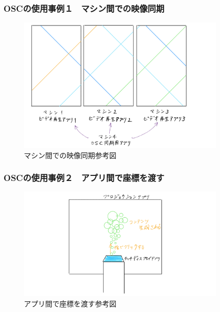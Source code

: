 \documentclass[10pt, dvipdfmx]{beamer}
\begin{document}
        \begin{frame}
            \frametitle{OSCの使用事例１　マシン間での映像同期}
                \begin{figure}[htb]
                    \includegraphics[width=100mm]{images/osc-1.png}
                    \caption{マシン間での映像同期参考図}
                    \label{fig:01}
                \end{figure}
        \end{frame}

        \begin{frame}
            \frametitle{OSCの使用事例２　アプリ間で座標を渡す}
                \begin{figure}[htb]
                    \includegraphics[width=100mm]{images/osc-2.png}
                    \caption{アプリ間で座標を渡す参考図}
                    \label{fig:02}
                \end{figure}
        \end{frame}
\end{document}
